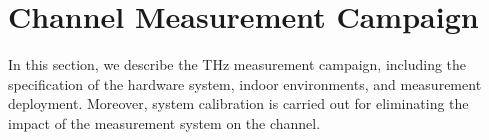 \documentclass[conference]{IEEEtran}
\begin{document}
\section{Channel Measurement Campaign}
In this section, we describe the THz measurement campaign, including the specification of the hardware system, indoor environments, and measurement deployment. Moreover, system calibration is carried out for eliminating the impact of the measurement system on the channel.
 

 \begin{comment}
\begin{table}[htbp]
  \centering
  \caption{Parameters of the Measurement System.}
    \begin{tabular}{lll}
        \toprule
    Parameter & \multicolumn{1}{l}{Symbol} & Value \\
    \midrule
    Start frequency &   $f_{start}$    & 130~GHz \\
    End frequency &   $f_{end}$    & 143~GHz \\

    Bandwidth &   $B_w$   & 13~GHz \\
    Sweeping points &   $ N$  & 1301\\
    Sweeping interval &    $\Delta f$   & 10~MHz \\
    Average noise floor &  $P_N$     & -120~dBm \\
    Test signal power &   $P_{in}$    & 1~mW \\
    HPBW of transmitter & $HPBW^{Tx}$     & $30^\circ$ \\
    HPBW of receiver &  $HPBW^{Rx}$  & $10^\circ$ \\
    Antenna gain at Tx &   $G_{\text{t}}$   & 25 dBi \\
    Antenna gain at Rx &   $G_{\text{r}}$   & 15 dBi \\
    Delay domain resolution &  $\Delta t$     & 76.9~ps \\
    Path length resolution &   $\Delta L$    & 2.3~cm \\
    Maximum excess delay &    $\tau_m$   & 100~ns \\
    Maximum path length &   $L_m$    & 30~m \\
    Azimuth rotation range &      & $[0^\circ:10^\circ:360^\circ]$ \\
    Elevation rotation range &    & $[-20^\circ:10^\circ:20^\circ]$ \\
        \bottomrule
    \end{tabular}%
  \label{tab:mparameters}%
\end{table}%

\end{comment}
\end{document}
